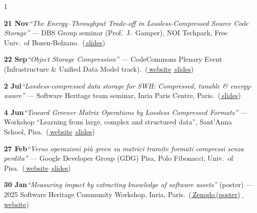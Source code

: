 \documentclass[10pt,a4paper,ragged2e,academicons]{altacv}
\newif\ifshortcv
\newcommand{\Lzenodo}[2]{\href{#2}{\faArchive\,Zenodo\,(#1)}}
\newcommand{\Lsep}{\;\textcolor{body!40}{\textbullet}\;}
\begin{document}
\begin{paracol}{1}
{
\begin{talklist}
  \item \textbf{21 Nov}\enspace \textit{``The Energy--Throughput Trade-off in Lossless-Compressed Source Code Storage''} --- DBS Group seminar (Prof.~J.~Gamper), NOI Techpark, Free Univ.~of Bozen-Bolzano.\tinv\ {\footnotesize(\href{https://www.francescotosoni.it/static/slides_20251121.pdf}{\faFilePowerpoint\,slides})}

  \item \textbf{22 Sep}\enspace \textit{``Object Storage Compression''} --- CodeCommons Plenary Event (Infrastructure \& Unified Data Model track).\tinv\ {\footnotesize(\href{https://codecommons.org/news/codecommons-annual-review-2025-09-22/}{\faGlobe\,website} \Lsep \href{https://www.francescotosoni.it/static/slides_20250922.pdf}{\faFilePowerpoint\,slides})}

  \item \textbf{2 Jul}\enspace \textit{``Lossless-compressed data storage for SWH: Compressed, tunable \& energy-aware''} --- Software Heritage team seminar, Inria Paris Centre, Paris.\tinv\ {\footnotesize(\href{https://www.francescotosoni.it/static/slides_20250702.pdf}{\faFilePowerpoint\,slides})}

  \item \textbf{4 Jun}\enspace \textit{``Toward Greener Matrix Operations by Lossless Compressed Formats''} --- Workshop ``Learning from large, complex and structured data'', Sant'Anna School, Pisa.\tinv\ {\footnotesize(\href{https://www.santannapisa.it/en/evento/learning-large-complex-and-structured-data-advances-methods-and-applications}{\faGlobe\,website} \Lsep \href{https://www.francescotosoni.it/static/slides_20250604.pdf}{\faFilePowerpoint\,slides})}

  \ifshortcv\else%
  \item \textbf{27 Feb}\enspace \textit{``Verso operazioni più green su matrici tramite formati compressi senza perdita''} --- Google Developer Group (GDG) Pisa, Polo Fibonacci, Univ.~of Pisa.\tinv\ {\footnotesize(\href{https://gdg.community.dev/events/details/google-gdg-pisa-presents-verso-operazioni-piu-green-su-matrici-tramite-formati-compressi-senza-perdita/}{\faGlobe\,website} \Lsep \href{https://www.francescotosoni.it/static/slides_20250227.pdf}{\faFilePowerpoint\,slides})}

  \item \textbf{30 Jan}\enspace \textit{``Measuring impact by extracting knowledge of software assets''} (poster) --- 2025 Software Heritage Community Workshop, Inria, Paris.\ {\footnotesize(\Lzenodo{poster}{https://zenodo.org/records/15230207} \Lsep \href{https://gitlab.softwareheritage.org/outreach/events/community-workshop-external/-/blob/main/2025-Community-workshop/presentation-page.md}{\faGlobe\,website})}
  \fi


\end{talklist}}
\end{paracol}
\end{document}
